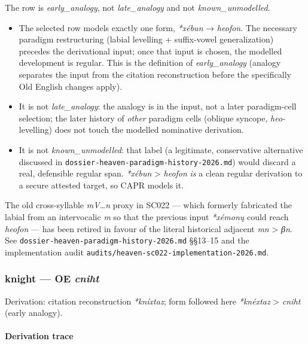 \documentclass[
  british,
  a4paper,
]{article}
\providecommand{\tightlist}{%
  \setlength{\itemsep}{0pt}\setlength{\parskip}{0pt}}
\providecommand{\Recon}[1]{\emph{*#1}}
\begin{document}
The row is \emph{early\_analogy}, not \emph{late\_analogy} and not
\emph{known\_unmodelled}.

\begin{itemize}
\tightlist
\item
  The selected row models exactly one form, \Recon{xébun} →
  {\emph{heofon}}. The necessary paradigm restructuring (labial
  levelling + suffix-vowel generalization) precedes the derivational
  input; once that input is chosen, the modelled development is regular.
  This is the definition of \emph{early\_analogy} (analogy separates the
  input from the citation reconstruction before the specifically Old
  English changes apply).
\item
  It is not \emph{late\_analogy}: the analogy is in the input, not a
  later paradigm-cell selection; the later history of \emph{other}
  paradigm cells (oblique syncope, \emph{heo-} levelling) does not touch
  the modelled nominative derivation.
\item
  It is not \emph{known\_unmodelled}: that label (a legitimate,
  conservative alternative discussed in
  \texttt{dossier-heaven-paradigm-history-2026.md}) would discard a
  real, defensible regular span. \emph{*xébun} \textgreater{}
  \emph{heofon} \emph{is} a clean regular derivation to a secure
  attested target, so CAPR models it.
\end{itemize}

The old cross-syllable \emph{mV\ldots n} proxy in SC022 --- which
formerly fabricated the labial from an intervocalic \emph{m} so that the
previous input \emph{*xémonų} could reach \emph{heofon} --- has been
retired in favour of the literal historical adjacent \emph{mn}
\textgreater{} \emph{βn}. See
\texttt{dossier-heaven-paradigm-history-2026.md} §§13--15 and the
implementation audit
\texttt{audits/heaven-sc022-implementation-2026.md}.

\subsubsection{\texorpdfstring{knight --- OE
\emph{cniht}}{knight --- OE cniht}}\label{knight-oe-cniht}

Derivation: citation reconstruction \emph{*kníxtaz}; form followed here
\emph{*knéxtaz} \textgreater{} \emph{cniht} (early analogy).

\paragraph{Derivation trace}\label{derivation-trace-121}
\end{document}
